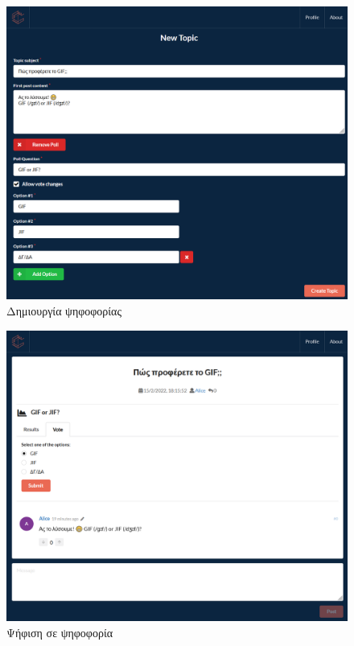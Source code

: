 \begin{figure}[H]
	\centering
	\includegraphics[width=\textwidth]{assets/figures/appendix-a/screenshot-6-poll-creation}
	\caption{Δημιουργία ψηφοφορίας}
\end{figure}

\begin{figure}[H]
	\centering
	\includegraphics[width=\textwidth]{assets/figures/appendix-a/screenshot-7-poll-voting}
	\caption{Ψήφιση σε ψηφοφορία}
\end{figure}

